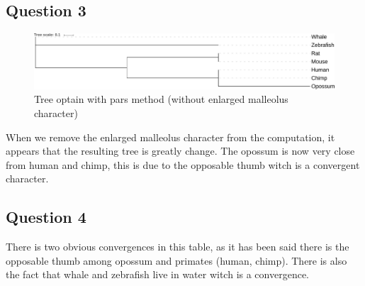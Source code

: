 \documentclass[]{article}
\begin{document}
\subsection{Question 3}

\begin{figure}[H]
	\includegraphics*[width = \linewidth]{../ex3/PARS2.pdf}
	\caption{Tree optain with pars method (without enlarged malleolus character)}
\end{figure}

When we remove the enlarged malleolus character from the computation, it appears that the resulting tree is greatly change. The opossum is now very close from human and chimp, this is due to the opposable thumb witch is a convergent character.

\subsection{Question 4}
There is two obvious convergences in this table, as it has been said there is the opposable thumb among opossum and primates (human, chimp). There is also the fact that whale and zebrafish live in water witch is a convergence.
\end{document}
